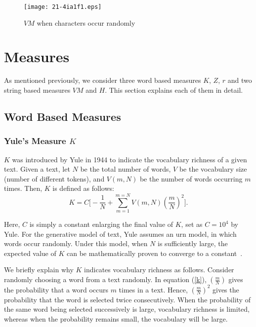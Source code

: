 \documentclass[english]{jnlp_1.4_rep}
\begin{document}
\begin{figure}[t]
\begin{center}
\texttt{[image: 21-4ia1f1.eps]}
\end{center}
\caption{$\mathit{VM}$ when characters occur randomly}
\label{zu:Golcher}
\end{figure}


\section{Measures} 
\label{sihyou}

As mentioned previously, we consider three word based measures $K$, $Z$, $r$ and two string based measures $\mathit{VM}$ and $H$. This section explains each of them in detail. 


\subsection{Word Based Measures}


\subsubsection*{Yule's Measure $K$}

$K$ was introduced by Yule in 1944 to indicate the vocabulary richness \cite{Yule} of a given text. Given a text, let $N$ be the total number of words, $V$ be the vocabulary size (number of different tokens), and $V(m,N)$ be the number of words occurring $m$ times. Then, $K$ is defined as follows:
\begin{equation}
K = C\Big[-\frac{1}{N}+{\sum_{m=1}^{m=N}V(m, N)\left(\frac{m}{N}\right)^2}\Big].  \label {k}
\end{equation}

Here, $C$ is simply a constant enlarging the final value of $K$, set as $C=10^{4}$ by Yule. For the generative model of text, Yule assumes an urn model, in which words occur randomly. Under this model, when $N$ is sufficiently large, the expected value of $K$ can be mathematically proven to converge to a constant~\cite{Baayen}. 

We briefly explain why $K$ indicates vocabulary richness as follows. Consider randomly choosing a word from a text randomly. In equation (\ref{k}), $(\frac{m}{N})$ gives the probability that a word occurs $m$ times in a text. Hence, $(\frac{m}{N})^2$ gives the probability that the word is selected twice consecutively. When the probability of the same word being selected successively is large, vocabulary richness is limited, whereas when the probability remains small, the vocabulary will be large. 
\end{document}
